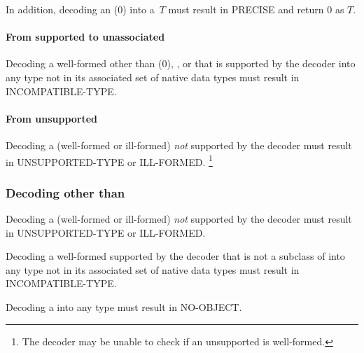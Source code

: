 In addition, decoding an \DborIntegerValue(0) into a~$T$ must result in PRECISE and return $0$ as $T$.

\paragraph{From supported to unassociated}

Decoding a well-formed \DborIntegerValue{} other than \DborIntegerValue(0), \DborBinaryRationalValue,
or \DborDecimalRationalValue{} that is supported by the decoder into any type not in its
associated set of native data types must result in INCOMPATIBLE-TYPE.

\paragraph{From unsupported}

Decoding a (well-formed or ill-formed) \DborNumberValue{} \emph{not} supported by the decoder
must result in UNSUPPORTED-TYPE or ILL-FORMED.%
\footnote{%
    The decoder may be unable to check if an unsupported \DborValue{} is well-formed.
}


\subsubsection{Decoding \DborValue{} other than \DborNumberValue}

Decoding a (well-formed or ill-formed) \DborValue{} \emph{not} supported by the decoder
must result in UNSUPPORTED-TYPE or ILL-FORMED.%

\medskip
Decoding a well-formed \DborValue{} supported by the decoder that is not a subclass of \DborNumberValue{}
into any type not in its associated set of native data types must result in INCOMPATIBLE-TYPE.

\medskip
Decoding a \DborNoneValue{} into any type must result in NO-OBJECT.
